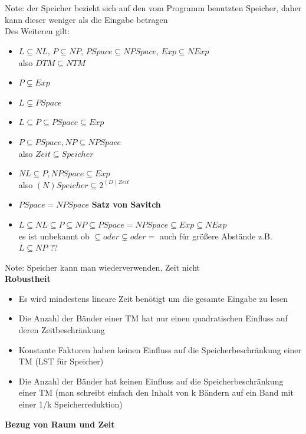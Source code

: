 \documentclass[12pt,a4paper]{article}
\begin{document}
\hfill \\
\hfill \\
Note: der Speicher bezieht sich auf den vom Programm benutzten Speicher, daher kann dieser weniger als die Eingabe betragen\\
Des Weiteren gilt:
\begin{itemize}
\item $L \subseteq NL$, $P \subseteq NP$, $PSpace \subseteq NPSpace$, $Exp \subseteq NExp$\\ also $DTM \subseteq NTM$
\item $P \subsetneq Exp$
\item $L \subsetneq PSpace$
\item $L \subseteq P \subseteq PSpace \subseteq Exp$
\item $P \subseteq PSpace, NP \subseteq NPSpace$\\ also $Zeit \subseteq Speicher$
\item $NL \subseteq P, NPSpace \subseteq Exp$\\ also $(N)Speicher \subseteq 2^{(D)Zeit}$
\item $PSpace = NPSpace$ \textbf{Satz von Savitch}
\item $L \subseteq NL \subseteq P \subseteq NP \subseteq PSpace = NPSpace \subseteq Exp \subseteq NExp$\\ es ist unbekannt ob $\subseteq oder \subsetneq oder = $ auch für größere Abstände z.B. $L \subseteq NP$ ??
\end{itemize}
Note: Speicher kann man wiederverwenden, Zeit nicht\\

\textbf{Robustheit}
\begin{itemize}
\item Es wird mindestens lineare Zeit benötigt um die gesamte Eingabe zu lesen
\item Die Anzahl der Bänder einer TM hat nur einen quadratischen Einfluss auf deren Zeitbeschränkung
\item Konstante Faktoren haben keinen Einfluss auf die Speicherbeschränkung einer TM (LST für Speicher)
\item Die Anzahl der Bänder hat keinen Einfluss auf die Speicherbeschränkung einer TM (man schreibt einfach den Inhalt von k Bändern auf ein Band mit einer 1/k Speicherreduktion)
\end{itemize}

\textbf{Bezug von Raum und Zeit}\\
\end{document}

